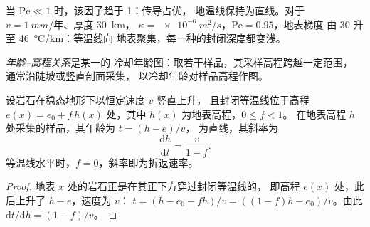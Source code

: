 当 $\mathrm{Pe} \ll 1$ 时，该因子趋于 1：传导占优，
地温线保持为直线。对于 $v = \qty{1}{mm/\text{年}}$、厚度 \qty{30}{km}，
$\kappa = \qty{e-6}{m^2/s}$，$\mathrm{Pe} = 0.95$，地表梯度
由 30 升至 \qty{46}{\celsius/km}：等温线向
地表聚集，每一种的封闭深度都变浅。

\begin{definition}[年龄–高程关系]\label{def:b3:orogenic-wedges:age-elevation}
\emph{年龄–高程关系}是某一的
冷却年龄图：取若干样品，其采样高程跨越一定范围，
通常沿陡坡或竖直剖面采集，
以冷却年龄对样品高程作图。
\end{definition}

\begin{proposition}[年龄–高程关系的斜率]\label{prop:b3:orogenic-wedges:age-elevation}
设岩石在稳态地形下以恒定速度 $v$ 竖直上升，
且封闭等温线位于高程 $e(x) = e_0 +
f\,h(x)$ 处，其中 $h(x)$ 为地表高程，$0 \le f < 1$。
在地表高程 $h$ 处采集的样品，其年龄为 $t = (h - e)/v$，
为直线，其斜率为
\[
  \frac{\mathrm dh}{\mathrm dt} = \frac{v}{1 - f}.
\]
等温线水平时，$f = 0$，斜率即为折返速率。
\end{proposition}

\begin{proof}
地表 $x$ 处的岩石正是在其正下方穿过封闭等温线的，
即高程 $e(x)$ 处，此后上升了 $h - e$，速度为 $v$：
$t = (h - e_0 - fh)/v = ((1 - f)h - e_0)/v$。由此 $\mathrm dt/\mathrm dh =
(1 - f)/v$。
\end{proof}

